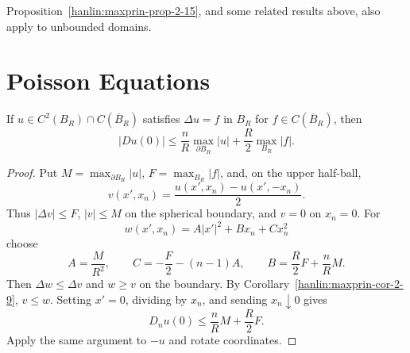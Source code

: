 \begin{remark}\label{hanlin:maxprin-remark-2-16}


Proposition~\ref{hanlin:maxprin-prop-2-15}, and some related results above, also
apply to unbounded domains.
\end{remark}

\section{Poisson Equations}\label{hanlin:maxprin-section-2-2}

\begin{lemma}\label{hanlin:poisson-lemma-2-17}


If $u\in C^2(B_R)\cap C(\overline B_R)$ satisfies $\Delta u=f$ in $B_R$ for
$f\in C(\overline B_R)$, then
\[
|Du(0)|\le \frac{n}{R}\max_{\partial B_R}|u|
 +\frac{R}{2}\max_{B_R}|f|.
\]
\end{lemma}
\begin{proof}
\sketch Put $M=\max_{\partial B_R}|u|$, $F=\max_{B_R}|f|$, and, on the upper
half-ball,
\[
v(x',x_n)=\frac{u(x',x_n)-u(x',-x_n)}2.
\]
Thus $|\Delta v|\le F$, $|v|\le M$ on the spherical boundary, and $v=0$ on
$x_n=0$. For
\[
w(x',x_n)=A|x'|^2+Bx_n+Cx_n^2
\]
choose
\[
A=\frac{M}{R^2},\qquad
C=-\frac F2-(n-1)A,\qquad
B=\frac R2F+\frac nR M.
\]
Then $\Delta w\le\Delta v$ and $w\ge v$ on the boundary. By
Corollary~\ref{hanlin:maxprin-cor-2-9}, $v\le w$. Setting $x'=0$, dividing by
$x_n$, and sending $x_n\downarrow0$ gives
\[
D_nu(0)\le\frac nR M+\frac R2F.
\]
Apply the same argument to $-u$ and rotate coordinates.
\end{proof}


